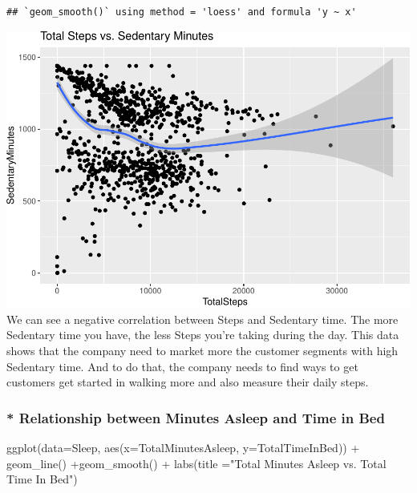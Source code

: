 \documentclass[
]{article}
\newenvironment{Shaded}{\begin{snugshade}}{\end{snugshade}}
\newcommand{\AttributeTok}[1]{\textcolor[rgb]{0.77,0.63,0.00}{#1}}
\newcommand{\FunctionTok}[1]{\textcolor[rgb]{0.00,0.00,0.00}{#1}}
\newcommand{\NormalTok}[1]{#1}
\newcommand{\SpecialCharTok}[1]{\textcolor[rgb]{0.00,0.00,0.00}{#1}}
\newcommand{\StringTok}[1]{\textcolor[rgb]{0.31,0.60,0.02}{#1}}
\begin{document}
\begin{verbatim}
## `geom_smooth()` using method = 'loess' and formula 'y ~ x'
\end{verbatim}

\includegraphics{Bellabeat_files/figure-latex/unnamed-chunk-17-1.pdf} We
can see a negative correlation between Steps and Sedentary time. The
more Sedentary time you have, the less Steps you're taking during the
day. This data shows that the company need to market more the customer
segments with high Sedentary time. And to do that, the company needs to
find ways to get customers get started in walking more and also measure
their daily steps.

\hypertarget{relationship-between-minutes-asleep-and-time-in-bed}{%
\subsubsection{\texorpdfstring{* \textbf{Relationship between Minutes
Asleep and Time in
Bed}}{* Relationship between Minutes Asleep and Time in Bed}}\label{relationship-between-minutes-asleep-and-time-in-bed}}

\begin{Shaded}
\begin{Highlighting}[]
\FunctionTok{ggplot}\NormalTok{(}\AttributeTok{data=}\NormalTok{Sleep, }\FunctionTok{aes}\NormalTok{(}\AttributeTok{x=}\NormalTok{TotalMinutesAsleep, }\AttributeTok{y=}\NormalTok{TotalTimeInBed)) }\SpecialCharTok{+} \FunctionTok{geom\_line}\NormalTok{() }\SpecialCharTok{+}\FunctionTok{geom\_smooth}\NormalTok{() }\SpecialCharTok{+} \FunctionTok{labs}\NormalTok{(}\AttributeTok{title =}\StringTok{"Total Minutes Asleep vs. Total Time In Bed"}\NormalTok{)}
\end{Highlighting}
\end{Shaded}
\end{document}
